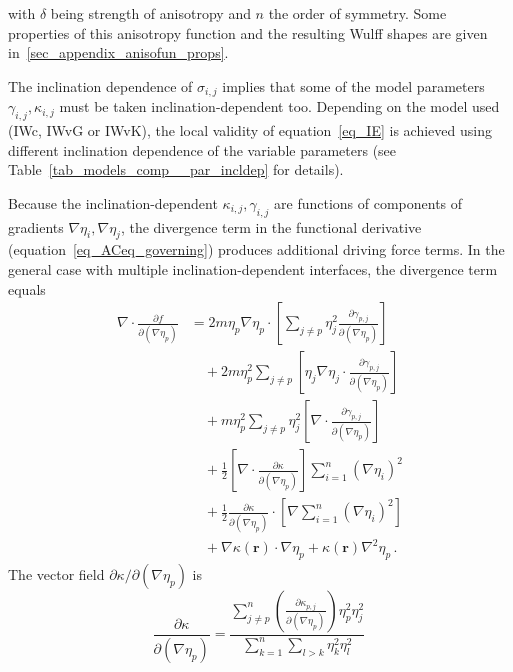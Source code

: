		with $\delta$ being strength of anisotropy and $n$ the order of symmetry. Some properties of this anisotropy function and the resulting Wulff shapes are given in~\ref{sec_appendix_anisofun_props}. 
		
		The inclination dependence of $\sigma_{i,j}$ implies that some of the model parameters $\gamma_{i,j},\kappa_{i,j}$ must be taken inclination-dependent too. Depending on the model used (IWc, IWvG or IWvK), the local validity of equation~\eqref{eq_IE} is achieved using different inclination dependence of the variable parameters (see Table~\ref{tab_models_comp__par_incldep} for details).
		
		Because the inclination-dependent $\kappa_{i,j},\gamma_{i,j}$ are functions of components of gradients $\nabla\eta_i,\nabla\eta_j$, the divergence term in the functional derivative (equation~\eqref{eq_ACeq_governing}) produces additional driving force terms. In the general case with multiple inclination-dependent interfaces, the divergence term equals
		\begin{equation}\label{eq_incldep_divDFterms}
			\begin{split}
				\nabla\cdot \frac{\partial f}{\partial(\nabla \eta_p)} &= 2m\eta_p\nabla\eta_p\cdot \left[\sum_{j\neq p}  \eta_j^2\frac{\partial \gamma_{p,j}}{\partial (\nabla\eta_p)}\right]  \\ 
				&\quad+ 2m\eta_p^2\sum_{j\neq p} \left[\eta_j\nabla\eta_j \cdot \frac{\partial \gamma_{p,j}}{\partial (\nabla\eta_p)}\right] \\
				&\quad+ m\eta_p^2\sum_{j\neq p}\eta_j^2\left[\nabla\cdot\frac{\partial \gamma_{p,j}}{\partial (\nabla\eta_p)}\right] \\
				&\quad + \frac{1}{2}\left[\nabla\cdot\frac{\partial \kappa}{\partial (\nabla\eta_p)}\right]\sum_{i=1}^n(\nabla \eta_i)^2 \\
				&\quad+ \frac{1}{2}\frac{\partial \kappa}{\partial (\nabla\eta_p)}\cdot\left[\nabla\sum_{i=1}^n(\nabla \eta_i)^2\right]  \\
				&\quad+ \nabla\kappa(\bm{r})\cdot\nabla\eta_p + \kappa(\bm{r})\nabla^2\eta_p \,.
			\end{split} 
		\end{equation}
		The vector field $\partial \kappa/\partial(\nabla\eta_p)$ is
		\begin{equation} \label{eq_dkppdGp}
			\frac{\partial \kappa}{\partial(\nabla\eta_p)} =  \frac{\sum\limits_{j\neq p}^n \left(\frac{\partial \kappa_{p,j}}{\partial (\nabla\eta_p)}\right)\eta_p^2\eta_j^2}{\sum\limits_{k=1}^n\sum\limits_{l>k}\eta_k^2\eta_l^2} \,
		\end{equation}
